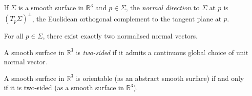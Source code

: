 \begin{definition}
	If $\Sigma$ is a smooth surface in $\mathbb R^3$ and $p \in \Sigma$, the \textit{normal direction} to $\Sigma$ at $p$ is $(T_p \Sigma)^\perp$, the Euclidean orthogonal complement to the tangent plane at $p$.
\end{definition}
\begin{remark}
	For all $p \in \Sigma$, there exist exactly two normalised normal vectors.
\end{remark}
\begin{definition}
	A smooth surface in $\mathbb R^3$ is \textit{two-sided} if it admits a continuous global choice of unit normal vector.
\end{definition}
\begin{lemma}
	A smooth surface in $\mathbb R^3$ is orientable (as an abstract smooth surface) if and only if it is two-sided (as a smooth surface in $\mathbb R^3$).
\end{lemma}
